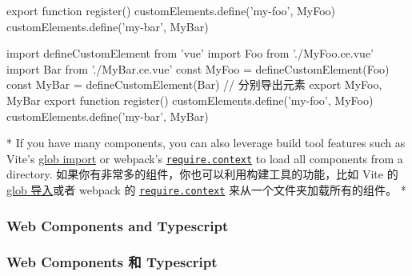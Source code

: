 \begin{paracol}{2}
\begin{codeJs}
export function register() {
  customElements.define('my-foo', MyFoo)
  customElements.define('my-bar', MyBar)
}
\end{codeJs}
\switchcolumn
\begin{codeJs}
import { defineCustomElement } from 'vue'
import Foo from './MyFoo.ce.vue'
import Bar from './MyBar.ce.vue'
const MyFoo = defineCustomElement(Foo)
const MyBar = defineCustomElement(Bar)
// 分别导出元素
export { MyFoo, MyBar }
export function register() {
  customElements.define('my-foo', MyFoo)
  customElements.define('my-bar', MyBar)
}
\end{codeJs}
\switchcolumn[0]*%
If you have many components, you can also leverage build tool features
such as Vite's
\href{https://vitejs.dev/guide/features.html\#glob-import}{glob import}
or webpack's
\href{https://webpack.js.org/guides/dependency-management/\#requirecontext}{\texttt{require.context}}
to load all components from a directory.
\switchcolumn
如果你有非常多的组件，你也可以利用构建工具的功能，比如 Vite 的
\href{https://cn.vitejs.dev/guide/features.html\#glob-import}{glob
导入}或者 webpack 的
\href{https://webpack.js.org/guides/dependency-management/\#requirecontext}{\texttt{require.context}}
来从一个文件夹加载所有的组件。
\switchcolumn[0]*%
\subsubsection{Web Components and Typescript}
\switchcolumn
\subsubsection{Web Components 和 Typescript}
\end{paracol}



